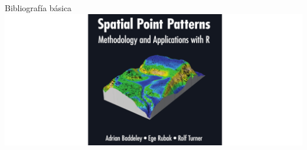 \documentclass[
  11pt,
  ignorenonframetext,
]{beamer}
\begin{document}
\begin{frame}{Bibliografía básica}
\protect\hypertarget{bibliografuxeda-buxe1sica}{}
\includegraphics{Figuras/Spat-book.png}
\end{frame}
\end{document}
